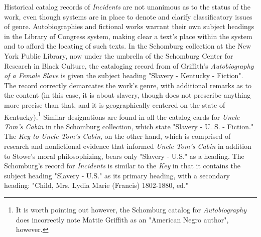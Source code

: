 Historical catalog records of \textit{Incidents} are not unanimous as to the status of the work, even though systems are in place to denote and clarify classificatory issues of genre. Autobiographies and fictional works warrant their own subject headings in the Library of Congress system, making clear a text's place within the system and to afford the locating of such texts. In the Schomburg collection at the New York Public Library, now under the umbrella of the Schomburg Center for Research in Black Culture, the cataloging record from of Griffith's \textit{Autobiography of a Female Slave} is given the subject heading "Slavery - Kentucky - Fiction". The record correctly demarcates the work's genre, with additional remarks as to the content (in this case, it is about slavery, though does not prescribe anything more precise than that, and it is geographically centered on the state of Kentucky).\footnote{It is worth pointing out however, the Schomburg catalog for \textit{Autobiography} does incorrectly note Mattie Griffith as an "American Negro author", however.} Similar designations are found in all the catalog cards for \textit{Uncle Tom's Cabin} in the Schomburg collection, which state "Slavery - U. S. - Fiction." The \textit{Key to Uncle Tom's Cabin}, on the other hand, which is comprised of research and nonfictional evidence that informed \textit{Uncle Tom's Cabin} in addition to Stowe's moral philosophizing, bears only "Slavery - U.S." as a heading. The Schomburg's record for \textit{Incidents} is similar to the \textit{Key} in that it contains the subject heading "Slavery - U.S." as its primary heading, with a secondary heading: "Child, Mrs. Lydia Marie (Francis) 1802-1880, ed." 

